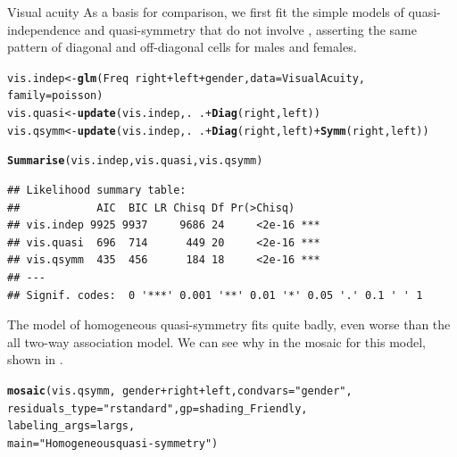 \documentclass[11pt]{book}\usepackage[]{graphicx}\usepackage[]{color}
\makeatletter
\newcommand{\hlstr}[1]{\textcolor[rgb]{0.192,0.494,0.8}{#1}}%
\newcommand{\hlopt}[1]{\textcolor[rgb]{0,0,0}{#1}}%
\newcommand{\hlstd}[1]{\textcolor[rgb]{0.345,0.345,0.345}{#1}}%
\newcommand{\hlkwb}[1]{\textcolor[rgb]{0.69,0.353,0.396}{#1}}%
\newcommand{\hlkwc}[1]{\textcolor[rgb]{0.333,0.667,0.333}{#1}}%
\newcommand{\hlkwd}[1]{\textcolor[rgb]{0.737,0.353,0.396}{\textbf{#1}}}%
\newenvironment{kframe}{%
 \def\at@end@of@kframe{}%
 \ifinner\ifhmode%
  \def\at@end@of@kframe{\end{minipage}}%
  \begin{minipage}{\columnwidth}%
 \fi\fi%
 \def\FrameCommand##1{\hskip\@totalleftmargin \hskip-\fboxsep
 \colorbox{shadecolor}{##1}\hskip-\fboxsep
     \hskip-\linewidth \hskip-\@totalleftmargin \hskip\columnwidth}%
 \MakeFramed {\advance\hsize-\width
   \@totalleftmargin\z@ \linewidth\hsize
   \@setminipage}}%
 {\par\unskip\endMakeFramed%
 \at@end@of@kframe}
\newenvironment{knitrout}{}{} %
\renewenvironment{knitrout}{\small\renewcommand{\baselinestretch}{.85}}{} %
\makeatother
\begin{document}
\begin{Example}{Visual acuity}
As a basis for comparison, we first fit the simple models of
quasi-independence and quasi-symmetry that do not involve ,
asserting the same pattern of diagonal and off-diagonal cells for males
and females.
\begin{knitrout}
\color{fgcolor}\begin{kframe}
\begin{alltt}
\hlstd{vis.indep} \hlkwb{<-} \hlkwd{glm}\hlstd{(Freq} \hlopt{~} \hlstd{right} \hlopt{+} \hlstd{left} \hlopt{+} \hlstd{gender,}  \hlkwc{data} \hlstd{= VisualAcuity,}
                 \hlkwc{family}\hlstd{=poisson)}
\hlstd{vis.quasi} \hlkwb{<-} \hlkwd{update}\hlstd{(vis.indep, .} \hlopt{~} \hlstd{.} \hlopt{+} \hlkwd{Diag}\hlstd{(right, left))}
\hlstd{vis.qsymm} \hlkwb{<-} \hlkwd{update}\hlstd{(vis.indep, .} \hlopt{~} \hlstd{.} \hlopt{+} \hlkwd{Diag}\hlstd{(right, left)} \hlopt{+} \hlkwd{Symm}\hlstd{(right, left))}

\hlkwd{Summarise}\hlstd{(vis.indep, vis.quasi, vis.qsymm)}
\end{alltt}
\begin{verbatim}
## Likelihood summary table:
##            AIC  BIC LR Chisq Df Pr(>Chisq)    
## vis.indep 9925 9937     9686 24     <2e-16 ***
## vis.quasi  696  714      449 20     <2e-16 ***
## vis.qsymm  435  456      184 18     <2e-16 ***
## ---
## Signif. codes:  0 '***' 0.001 '**' 0.01 '*' 0.05 '.' 0.1 ' ' 1
\end{verbatim}
\end{kframe}
\end{knitrout}
The model of homogeneous quasi-symmetry fits quite badly, even worse than the all two-way
association model.  We can see why in the mosaic for this model, shown in .
\begin{knitrout}
\color{fgcolor}\begin{kframe}
\begin{alltt}
\hlkwd{mosaic}\hlstd{(vis.qsymm,} \hlopt{~} \hlstd{gender} \hlopt{+} \hlstd{right} \hlopt{+} \hlstd{left,} \hlkwc{condvars}\hlstd{=}\hlstr{"gender"}\hlstd{,}
       \hlkwc{residuals_type}\hlstd{=}\hlstr{"rstandard"}\hlstd{,} \hlkwc{gp}\hlstd{=shading_Friendly,}
       \hlkwc{labeling_args}\hlstd{=largs,}
       \hlkwc{main}\hlstd{=}\hlstr{"Homogeneous quasi-symmetry"}\hlstd{)}
\end{alltt}
\end{kframe}\begin{figure}[!htbp]



\end{figure}
\end{knitrout}
\end{Example}
\end{document}
